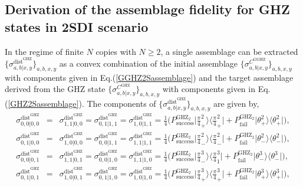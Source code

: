 \documentclass[reprint,superscriptaddress,nofootinbib,amsmath,amssymb,aps,pra,longbibliography]{revtex4-1}
\begin{document}
\begin{widetext}
\section{Derivation of the assemblage fidelity for GHZ states in 2SDI scenario}\label{app6}

In the regime of finite $N$ copies with $N \geq 2$, a single assemblage can be extracted $\{\sigma_{a,b|x,y}^{\text{dist}^{\text{GHZ}}}\}_{a,b,x,y}$ as a convex combination of the initial assemblage $\{\sigma_{a,b|x,y}^{C^{\text{GGHZ}}}\}_{a,b,x,y}$ with components given in Eq.(\ref{GGHZ2Sassemblage}) and the target assemblage derived from the GHZ state $\{\sigma_{a,b|x,y}^{C^{\text{GHZ}}}\}_{a,b,x,y}$ with components given in Eq.(\ref{GHZ2Sassemblage}). The components of $\{\sigma_{a,b|x,y}^{\text{dist}^{\text{GHZ}}}\}_{a,b,x,y}$ are given by,
\begin{eqnarray}
	\sigma_{0,0|0,0}^{\text{dist}^{\text{GHZ}}} &=& \sigma_{1,1|0,0}^{\text{dist}^{\text{GHZ}}} = \sigma_{0,1|1,1}^{\text{dist}^{\text{GHZ}}} = \sigma_{1,0|1,1}^{\text{dist}^{\text{GHZ}}} = \frac{1}{4} \Bigg(P^{\text{GHZ}_2}_{\text{success}}\Bigg| \frac{\pi}{4}_+^2 \Bigg\rangle \Bigg\langle \frac{\pi}{4}_+^2 \Bigg| + P^{\text{GHZ}_2}_{\text{fail}} \Big| \theta_+^2 \Big\rangle \Big\langle \theta_+^2 \Big| \Bigg), \nonumber \\ 
	\sigma_{0,1|0,0}^{\text{dist}^{\text{GHZ}}} &=& \sigma_{1,0|0,0}^{\text{dist}^{\text{GHZ}}} = \sigma_{0,0|1,1}^{\text{dist}^{\text{GHZ}}} = \sigma_{1,1|1,1}^{\text{dist}^{\text{GHZ}}} = \frac{1}{4} \Bigg(P^{\text{GHZ}_2}_{\text{success}}\Bigg| \frac{\pi}{4}_-^2 \Bigg\rangle \Bigg\langle \frac{\pi}{4}_-^2 \Bigg| + P^{\text{GHZ}_2}_{\text{fail}} \Big| \theta_-^2 \Big\rangle \Big\langle \theta_-^2 \Big|\Bigg), \nonumber \\ 
    \sigma_{0,0|0,1}^{\text{dist}^{\text{GHZ}}} &=& \sigma_{1,1|0,1}^{\text{dist}^{\text{GHZ}}} = \sigma_{0,0|1,0}^{\text{dist}^{\text{GHZ}}} = \sigma_{1,1|1,0}^{\text{dist}^{\text{GHZ}}} = \frac{1}{4} \Bigg(P^{\text{GHZ}_2}_{\text{success}}\Bigg| \frac{\pi}{4}_-^3 \Bigg\rangle \Bigg\langle \frac{\pi}{4}_1^3 \Bigg| + P^{\text{GHZ}_2}_{\text{fail}} \Big| \theta_-^3 \Big\rangle \Big\langle \theta_-^3 \Big|\Bigg), \nonumber \\ 
    \sigma_{0,1|0,1}^{\text{dist}^{\text{GHZ}}} &=& \sigma_{1,0|0,1}^{\text{dist}^{\text{GHZ}}} = \sigma_{0,1|1,0}^{\text{dist}^{\text{GHZ}}} = \sigma_{1,0|1,0}^{\text{dist}^{\text{GHZ}}} = \frac{1}{4} \Bigg(P^{\text{GHZ}_2}_{\text{success}}\Bigg| \frac{\pi}{4}_+^3 \Bigg\rangle \Bigg\langle \frac{\pi}{4}_+^3 \Bigg| + P^{\text{GHZ}_2}_{\text{fail}} \Big| \theta_+^3 \Big\rangle \Big\langle \theta_+^3 \Big| \Bigg), \nonumber \\

\end{eqnarray}
\end{widetext}
\end{document}

